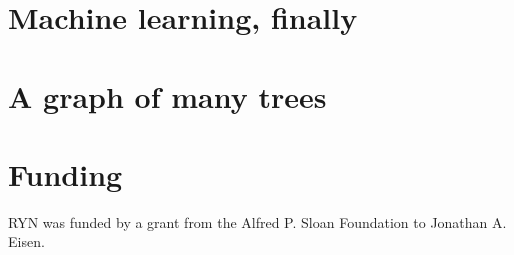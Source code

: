 \documentclass[
10pt, %
a4paper, %
oneside, %
headinclude,footinclude, %
BCOR5mm, %
]{scrartcl}
\begin{document}
\section{Machine learning, finally}

\section{A graph of many trees}



\section{Funding}

RYN was funded by a grant from the Alfred P. Sloan Foundation to Jonathan A. Eisen.

\printbibliography[heading=subbibliography]

\clearpage


\end{document}
